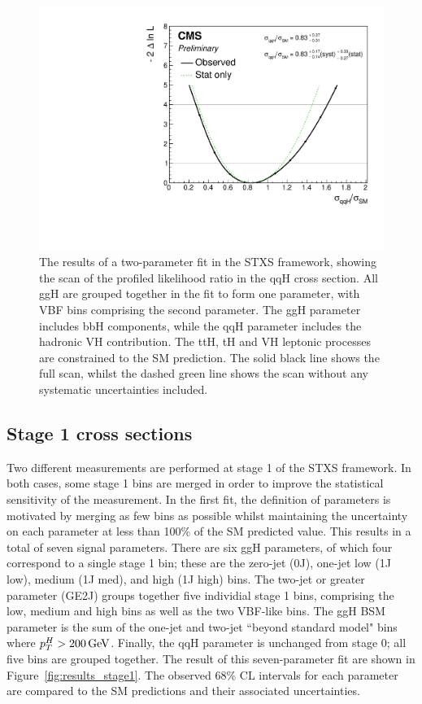 {\begin{figure}[hptb]
\centering
\includegraphics[width=\textwidth]{Figures/Results/ObsStage0_r_qqH.pdf}
\caption{
  The results of a two-parameter fit in the STXS framework,
  showing the scan of the profiled likelihood ratio in the qqH cross section.
  All ggH are grouped together in the fit to form one parameter, 
  with VBF bins comprising the second parameter.
  The ggH parameter includes bbH components, 
  while the qqH parameter includes the hadronic VH contribution. 
  The ttH, tH and VH leptonic processes are constrained to the SM prediction. 
  The solid black line shows the full scan, 
  whilst the dashed green line shows the scan without any systematic uncertainties included.
}
\label{fig:results_Stage0_qqH}
\end{figure}

\subsection{Stage 1 cross sections}

Two different measurements are performed at stage 1 of the STXS framework.
In both cases, some stage 1 bins are merged 
in order to improve the statistical sensitivity of the measurement.
In the first fit, the definition of parameters is motivated by merging as few bins as possible
whilst maintaining the uncertainty on each parameter at less than 100\% of the SM predicted value.
This results in a total of seven signal parameters.
There are six ggH parameters, of which four correspond to a single stage 1 bin;
these are the zero-jet (0J), one-jet low (1J low), medium (1J med), and high (1J high) \ptH bins.
The two-jet or greater parameter (GE2J) groups together five individial stage 1 bins, 
comprising the low, medium and high \ptH bins as well as the two VBF-like bins.
The ggH BSM parameter is the sum of the one-jet and two-jet ``beyond standard model" bins
where $p_T^H > \SI{200}{GeV}$.
Finally, the qqH parameter is unchanged from stage 0;
all five bins are grouped together.
The result of this seven-parameter fit are shown in Figure~\ref{fig:results_stage1}. 
The observed 68\% CL intervals for each parameter are compared 
to the SM predictions and their associated uncertainties.

}
